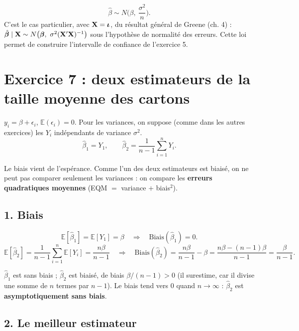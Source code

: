 \documentclass[11pt,a4paper]{article}
\newcommand{\vi}{\bm{\iota}}
\newcommand{\E}{\mathbb{E}}\newcommand{\Var}{\operatorname{Var}}\newcommand{\Cov}{\operatorname{Cov}}
\newcommand{\sumi}{\sum_{i=1}^{n}}
\begin{document}
\begin{reponse}
\[
\hat\beta\sim N\Big(\beta,\ \frac{\sigma^2}{n}\Big).
\]
C'est le cas particulier, avec $\vX=\vi$, du résultat général de Greene (ch. 4) : $\hat{\bm\beta}\mid\mathbf{X}\sim N\big(\bm\beta,\ \sigma^2(\mathbf{X}'\mathbf{X})^{-1}\big)$ sous l'hypothèse de normalité des erreurs. Cette loi permet de construire l'intervalle de confiance de l'exercice 5.
\end{reponse}

\section{Exercice 7 : deux estimateurs de la taille moyenne des cartons}

$y_i=\beta+\epsilon_i$, $\E(\epsilon_i)=0$. Pour les variances, on suppose (comme dans les autres exercices) les $Y_i$ indépendants de variance $\sigma^2$.
\[
\hat\beta_1=Y_1,\qquad \hat\beta_2=\frac1{n-1}\sumi Y_i .
\]

\begin{idee}
Le biais vient de l'espérance. Comme l'un des deux estimateurs est biaisé, on ne peut pas comparer seulement les variances : on compare les \textbf{erreurs quadratiques moyennes} (EQM $=$ variance $+$ biais$^2$).
\end{idee}

\subsection*{1. Biais}
\[
\E[\hat\beta_1]=\E[Y_1]=\beta\quad\Longrightarrow\quad\text{Biais}(\hat\beta_1)=0 .
\]
\[
\E[\hat\beta_2]=\frac1{n-1}\sumi\E[Y_i]=\frac{n\beta}{n-1}
\quad\Longrightarrow\quad
\text{Biais}(\hat\beta_2)=\frac{n\beta}{n-1}-\beta=\frac{n\beta-(n-1)\beta}{n-1}=\frac{\beta}{n-1}.
\]

\begin{reponse}
$\hat\beta_1$ est sans biais ; $\hat\beta_2$ est biaisé, de biais $\beta/(n-1)>0$ (il surestime, car il divise une somme de $n$ termes par $n-1$). Le biais tend vers 0 quand $n\to\infty$ : $\hat\beta_2$ est \textbf{asymptotiquement sans biais}.
\end{reponse}

\subsection*{2. Le meilleur estimateur}
\end{document}
